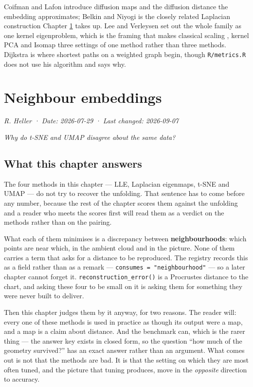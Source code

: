 \documentclass[
  british,
  a4paper,
]{book}
\begin{document}
Coifman and Lafon \citep{coifman2006diffusion} introduce diffusion maps and the
diffusion distance the embedding approximates; Belkin and Niyogi
\citep{belkin2003laplacian} is the closely related Laplacian construction Chapter
\ref{neighbor} takes up. Lee and Verleysen \citep{lee2007nonlinear} set out the whole
family as one kernel eigenproblem, which is the framing that makes classical
scaling \citep{torgerson1952mds}, kernel PCA \citep{scholkopf1998kernelpca} and Isomap
three settings of one method rather than three methods. Dijkstra
\citep{dijkstra1959note} is where shortest paths on a weighted graph begin, though
\texttt{R/metrics.R} does not use his algorithm and says why.

\chapter{Neighbour embeddings}\label{neighbor}

\emph{R. Heller · Date: 2026-07-29 · Last changed: 2026-09-07}

\emph{Why do t-SNE and UMAP disagree about the same data?}

\section{What this chapter answers}\label{nbr-question}

The four methods in this chapter --- LLE, Laplacian eigenmaps, t-SNE and UMAP ---
do not try to recover the unfolding. That sentence has to come before any
number, because the rest of the chapter scores them against the unfolding and a
reader who meets the scores first will read them as a verdict on the methods
rather than on the pairing.

What each of them minimises is a discrepancy between \textbf{neighbourhoods}: which
points are near which, in the ambient cloud and in the picture. None of them
carries a term that asks for a distance to be reproduced. The registry records
this as a field rather than as a remark --- \texttt{consumes\ =\ "neighbourhood"} --- so a
later chapter cannot forget it. \texttt{reconstruction\_error()} is a Procrustes
distance to the chart, and asking these four to be small on it is asking them
for something they were never built to deliver.

Then this chapter judges them by it anyway, for two reasons. The reader will:
every one of these methods is used in practice as though its output were a map,
and a map is a claim about distance. And the benchmark can, which is the rarer
thing --- the answer key exists in closed form, so the question ``how much of the
geometry survived?'' has an exact answer rather than an argument. What comes out
is not that the methods are bad. It is that the setting on which they are most
often tuned, and the picture that tuning produces, move in the \emph{opposite}
direction to accuracy.
\end{document}
